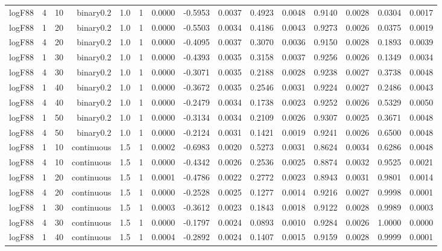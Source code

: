 \begin{longtable}{rrrrrrrrrrrrrrr}
  logF88 & 4 & 10 & binary0.2 & 1.0 & 1 & 0.0000 & -0.5953 & 0.0037 & 0.4923 & 0.0048 & 0.9140 & 0.0028 & 0.0304 & 0.0017 \\ 
  logF88 & 1 & 20 & binary0.2 & 1.0 & 1 & 0.0000 & -0.5503 & 0.0034 & 0.4186 & 0.0043 & 0.9273 & 0.0026 & 0.0375 & 0.0019 \\ 
  logF88 & 4 & 20 & binary0.2 & 1.0 & 1 & 0.0000 & -0.4095 & 0.0037 & 0.3070 & 0.0036 & 0.9150 & 0.0028 & 0.1893 & 0.0039 \\ 
  logF88 & 1 & 30 & binary0.2 & 1.0 & 1 & 0.0000 & -0.4393 & 0.0035 & 0.3158 & 0.0037 & 0.9256 & 0.0026 & 0.1349 & 0.0034 \\ 
  logF88 & 4 & 30 & binary0.2 & 1.0 & 1 & 0.0000 & -0.3071 & 0.0035 & 0.2188 & 0.0028 & 0.9238 & 0.0027 & 0.3738 & 0.0048 \\ 
  logF88 & 1 & 40 & binary0.2 & 1.0 & 1 & 0.0000 & -0.3672 & 0.0035 & 0.2546 & 0.0031 & 0.9224 & 0.0027 & 0.2486 & 0.0043 \\ 
  logF88 & 4 & 40 & binary0.2 & 1.0 & 1 & 0.0000 & -0.2479 & 0.0034 & 0.1738 & 0.0023 & 0.9252 & 0.0026 & 0.5329 & 0.0050 \\ 
  logF88 & 1 & 50 & binary0.2 & 1.0 & 1 & 0.0000 & -0.3134 & 0.0034 & 0.2109 & 0.0026 & 0.9307 & 0.0025 & 0.3671 & 0.0048 \\ 
  logF88 & 4 & 50 & binary0.2 & 1.0 & 1 & 0.0000 & -0.2124 & 0.0031 & 0.1421 & 0.0019 & 0.9241 & 0.0026 & 0.6500 & 0.0048 \\ 
  logF88 & 1 & 10 & continuous & 1.5 & 1 & 0.0002 & -0.6983 & 0.0020 & 0.5273 & 0.0031 & 0.8624 & 0.0034 & 0.6286 & 0.0048 \\ 
  logF88 & 4 & 10 & continuous & 1.5 & 1 & 0.0000 & -0.4342 & 0.0026 & 0.2536 & 0.0025 & 0.8874 & 0.0032 & 0.9525 & 0.0021 \\ 
  logF88 & 1 & 20 & continuous & 1.5 & 1 & 0.0001 & -0.4786 & 0.0022 & 0.2772 & 0.0023 & 0.8943 & 0.0031 & 0.9801 & 0.0014 \\ 
  logF88 & 4 & 20 & continuous & 1.5 & 1 & 0.0000 & -0.2528 & 0.0025 & 0.1277 & 0.0014 & 0.9216 & 0.0027 & 0.9998 & 0.0001 \\ 
  logF88 & 1 & 30 & continuous & 1.5 & 1 & 0.0003 & -0.3612 & 0.0023 & 0.1843 & 0.0018 & 0.9122 & 0.0028 & 0.9989 & 0.0003 \\ 
  logF88 & 4 & 30 & continuous & 1.5 & 1 & 0.0000 & -0.1797 & 0.0024 & 0.0893 & 0.0010 & 0.9284 & 0.0026 & 1.0000 & 0.0000 \\ 
  logF88 & 1 & 40 & continuous & 1.5 & 1 & 0.0004 & -0.2892 & 0.0024 & 0.1407 & 0.0015 & 0.9159 & 0.0028 & 0.9999 & 0.0001 \\ 

\end{longtable}
